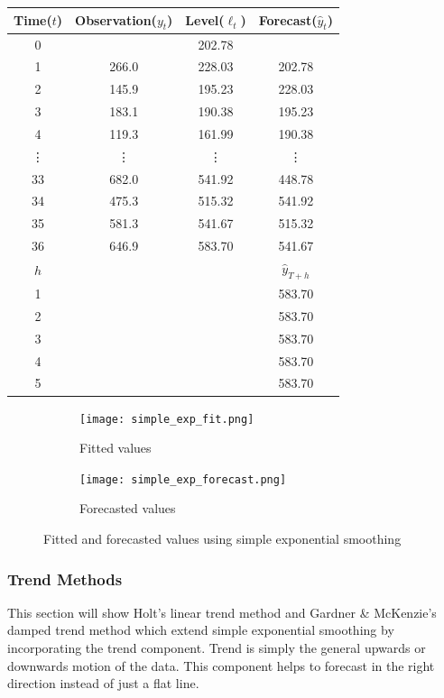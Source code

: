 \documentclass{article}
\begin{document}
  \begin{center}
    \begin{tabular}{||c c c c||} 
     \hline
     Time($t$) & Observation($y_t$) & Level($\ell_t$) & Forecast($\hat{y}_t$) \\ [0.5ex] 
     \hline
     0 &       & 202.78 &  \\ 
     \hline
     1 & 266.0 & 228.03 & 202.78 \\
     \hline
     2 & 145.9 & 195.23 & 228.03 \\
     \hline
     3 & 183.1 & 190.38 & 195.23 \\
     \hline
     4 & 119.3 & 161.99 & 190.38 \\
     \hline
     \vdots & \vdots & \vdots & \vdots \\
     \hline
     33 & 682.0 & 541.92 & 448.78 \\
     \hline
     34 & 475.3 & 515.32 & 541.92 \\
     \hline
     35 & 581.3 & 541.67 & 515.32 \\
     \hline
     36 & 646.9 & 583.70 & 541.67 \\
     \hline
     $h$ &  &  & $\hat{y}_{T+h}$ \\
     \hline
     1 &  &  & 583.70 \\
     \hline
     2 &  &  & 583.70 \\
     \hline
     3 &  &  & 583.70 \\
     \hline
     4 &  &  & 583.70 \\
     \hline
     5 &  &  & 583.70 \\
     \hline
    \end{tabular}
  \end{center}

  \begin{figure}[H]
    \centering
    \captionsetup{justification=centering}
    \begin{subfigure}[b]{0.49\linewidth}
      \texttt{[image: simple\_exp\_fit.png]}
      \caption{Fitted values}
    \end{subfigure}
    \begin{subfigure}[b]{0.49\linewidth}
      \texttt{[image: simple\_exp\_forecast.png]}
      \caption{Forecasted values}
    \end{subfigure}
    \caption{Fitted and forecasted values using simple exponential smoothing}
  \end{figure}

  \subsubsection{Trend Methods}
  This section will show Holt's linear trend method and Gardner \& McKenzie's damped trend method which extend simple exponential smoothing by incorporating the trend component. Trend is simply the general upwards or downwards motion of the data. This component helps to forecast in the right direction instead of just a flat line.
\end{document}
